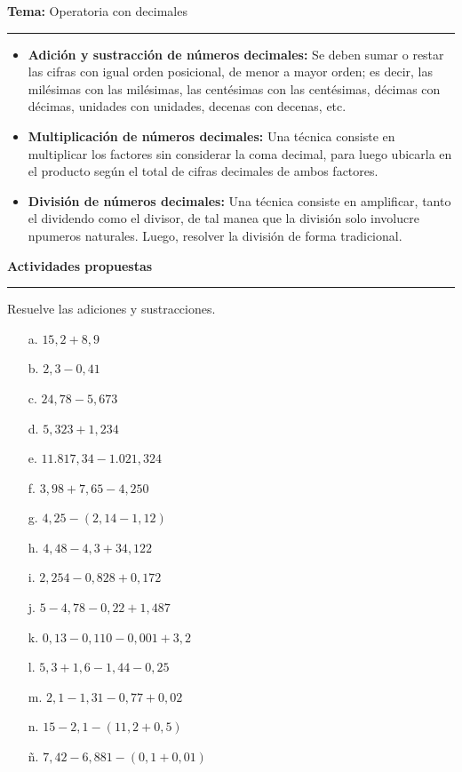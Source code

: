 \documentclass[spanish,letterpaper, 11pt, addpoints, answers]{exam}
\begin{document}
\begin{questions}
\newpage

  \parbox{6in}{
    \textbf{Tema:} Operatoria con decimales}
    \vspace{0.15in}
    \hrule
    
    \begin{itemize}
      \item \textbf{Adición y sustracción de números decimales:} Se deben sumar o restar las cifras con igual orden posicional, de menor a mayor orden; es decir, las milésimas con las milésimas, las centésimas con las centésimas, décimas con décimas, unidades con unidades, decenas con decenas, etc. 
      
      \item \textbf{Multiplicación de números decimales:} Una técnica consiste en multiplicar los factores sin considerar la coma decimal, para luego ubicarla en el producto según el total de cifras decimales de ambos factores.
      \item \textbf{División de números decimales:} Una técnica consiste en amplificar, tanto el dividendo como el divisor, de tal manea que la división solo involucre npumeros naturales. Luego, resolver la división de forma tradicional.
    \end{itemize}

    \parbox{6in}{
      \textbf{Actividades propuestas}}
      \vspace{0.15in}
      \hrule 


      \question Resuelve las adiciones y sustracciones.
      \begin{multicols}{2}
        \begin{itemize}
          \item[a.] $15,2+8,9$
          \item[b.] $2,3-0,41$
          \item[c.] $24,78-5,673$
          \item[d.] $5,323+1,234$
          \item[e.] $11.817,34-1.021,324$
          \item[f.] $3,98+7,65-4,250$
          \item[g.] $4,25-(2,14-1,12)$
          \item[h.] $4,48-4,3+34,122$
          \item[i.] $2,254-0,828+0,172$
          \item[j.] $5-4,78-0,22+1,487$
          \item[k.] $0,13-0,110-0,001+3,2$
          \item[l.] $5,3+1,6-1,44-0,25$
          \item[m.] $2,1-1,31-0,77+0,02$
          \item[n.] $15-2,1-(11,2+0,5)$
          \item[ñ.] $7,42-6,881-(0,1+0,01)$       
        \end{itemize}
        

\end{multicols}
\end{questions}
\end{document}
